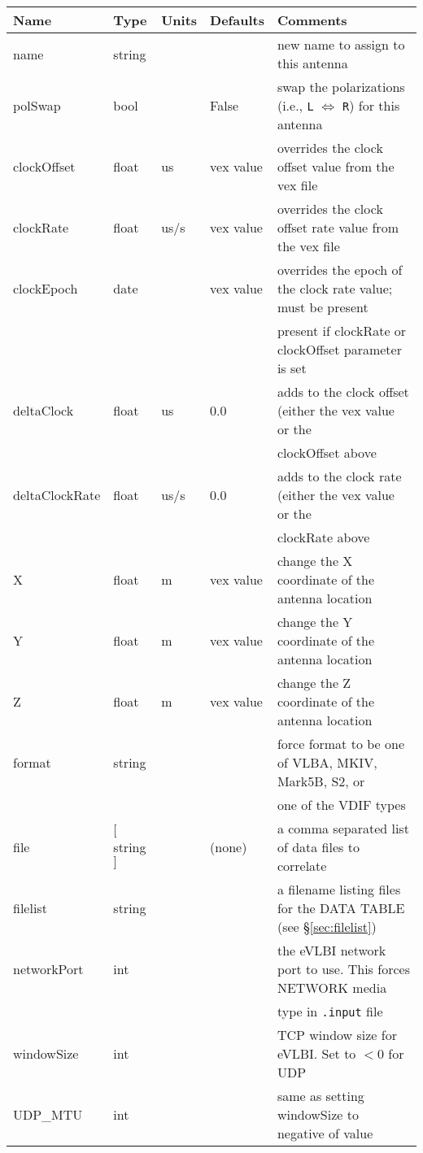 \begin{center}
\begin{tabular}{l l l l l}
\hline
Name		& Type		& Units 	& Defaults	& Comments \\
\hline
name		& string	&       	&		& new name to assign to this antenna \\
polSwap		& bool		&       	& False		& swap the polarizations (i.e., {\tt L} $\Leftrightarrow$ {\tt R}) for this antenna \\
clockOffset	& float		& us		& vex value	& overrides the clock offset value from the vex file \\
clockRate	& float		& us/s		& vex value	& overrides the clock offset rate value from the vex file \\
clockEpoch	& date		&		& vex value	& overrides the epoch of the clock rate value; must be present \\
		&		&		&		& present if clockRate or clockOffset parameter is set \\
deltaClock	& float		& us		& 0.0		& adds to the clock offset (either the vex value or the \\
		&		&		&		& clockOffset above  \\
deltaClockRate	& float		& us/s		& 0.0		& adds to the clock rate (either the vex value or the \\
		&		&		&		& clockRate above \\
X		& float		& m		& vex value	& change the X coordinate of the antenna location \\
Y		& float		& m		& vex value	& change the Y coordinate of the antenna location \\
Z		& float		& m		& vex value	& change the Z coordinate of the antenna location \\
format		& string	&		&		& force format to be one of VLBA, MKIV, Mark5B, S2, or \\
		&		&		&		& one of the VDIF types \\
file		& $[$string$]$	&		& (none)	& a comma separated list of data files to correlate \\
filelist	& string	&		&		& a filename listing files for the DATA TABLE (see \S\ref{sec:filelist}) \\
networkPort	& int		&		&		& the eVLBI network port to use. This forces NETWORK media \\
		&		&		&		& type in {\tt .input} file \\
windowSize	& int		&		&		& TCP window size for eVLBI. Set to $<0$ for UDP \\
UDP\_MTU	& int		&		&		& same as setting windowSize to negative of value \\

\end{tabular}
\end{center}
